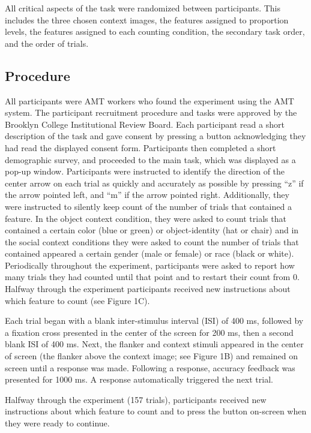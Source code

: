 \documentclass[english,,man,floatsintext]{apa6}
\begin{document}
All critical aspects of the task were randomized between participants. This includes the three chosen context images, the features assigned to proportion levels, the features assigned to each counting condition, the secondary task order, and the order of trials.

\hypertarget{procedure}{%
\subsection{Procedure}\label{procedure}}

All participants were AMT workers who found the experiment using the AMT system. The participant recruitment procedure and tasks were approved by the Brooklyn College Institutional Review Board. Each participant read a short description of the task and gave consent by pressing a button acknowledging they had read the displayed consent form. Participants then completed a short demographic survey, and proceeded to the main task, which was displayed as a pop-up window. Participants were instructed to identify the direction of the center arrow on each trial as quickly and accurately as possible by pressing \enquote{z} if the arrow pointed left, and \enquote{m} if the arrow pointed right. Additionally, they were instructed to silently keep count of the number of trials that contained a feature. In the object context condition, they were asked to count trials that contained a certain color (blue or green) or object-identity (hat or chair) and in the social context conditions they were asked to count the number of trials that contained appeared a certain gender (male or female) or race (black or white). Periodically throughout the experiment, participants were asked to report how many trials they had counted until that point and to restart their count from 0. Halfway through the experiment participants received new instructions about which feature to count (see Figure 1C).

Each trial began with a blank inter-stimulus interval (ISI) of 400 ms, followed by a fixation cross presented in the center of the screen for 200 ms, then a second blank ISI of 400 ms. Next, the flanker and context stimuli appeared in the center of screen (the flanker above the context image; see Figure 1B) and remained on screen until a response was made. Following a response, accuracy feedback was presented for 1000 ms. A response automatically triggered the next trial.

Halfway through the experiment (157 trials), participants received new instructions about which feature to count and to press the button on-screen when they were ready to continue.
\end{document}
